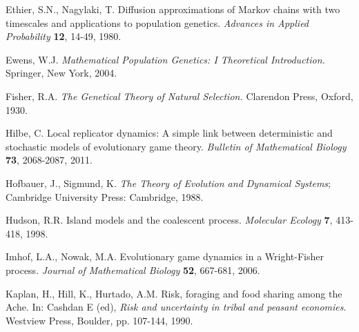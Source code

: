 \documentclass[11pt]{article}
\begin{document}
\begin{thebibliography}{99}
Ethier, S.N., Nagylaki, T. Diffusion approximations of Markov chains with two timescales and applications to population genetics. {\it Advances in Applied Probability} {\bf 12}, 14-49, 1980.

%
Ewens, W.J. {\it Mathematical Population Genetics: I Theoretical Introduction.} Springer, New York, 2004.

Fisher, R.A. {\it The Genetical Theory of Natural Selection.} Clarendon Press, Oxford, 1930.

%
% 
%
%

Hilbe, C. Local replicator dynamics: A simple link between deterministic and stochastic models of evolutionary game theory. {\it Bulletin of Mathematical Biology} {\bf 73}, 2068-2087, 2011.


Hofbauer, J., Sigmund, K.  {\em The Theory of Evolution and Dynamical Systems}; Cambridge University Press: Cambridge, 1988. 


Hudson, R.R. Island models and the coalescent process. {\it Molecular Ecology} {\bf 7}, 413-418, 1998.

Imhof, L.A., Nowak, M.A. Evolutionary game dynamics in a Wright-Fisher process. {\it Journal of Mathematical Biology} {\bf 52}, 667-681, 2006.




Kaplan, H., Hill, K., Hurtado, A.M. Risk, foraging and food sharing among the Ache. In: Cashdan E (ed), \emph{Risk and uncertainty in tribal and peasant economies}. Westview Press, Boulder, pp. 107-144, 1990.


\end{thebibliography}
\end{document}
